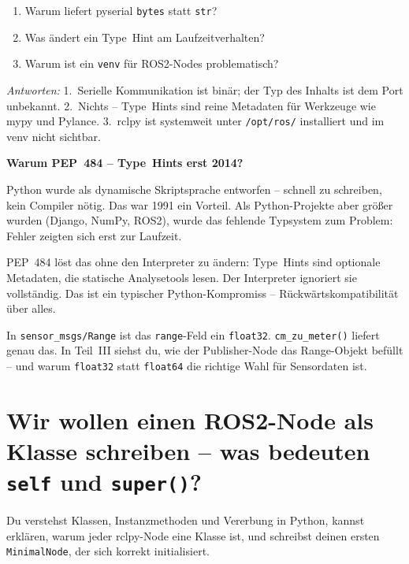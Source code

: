 \begin{quizBox}
\begin{enumerate}
\item Warum liefert pyserial \texttt{bytes} statt \texttt{str}?
\item Was ändert ein Type~Hint am Laufzeitverhalten?
\item Warum ist ein \texttt{venv} für ROS2-Nodes problematisch?
\end{enumerate}
\textit{Antworten:}
1.~Serielle Kommunikation ist binär; der Typ des Inhalts ist dem Port unbekannt.
2.~Nichts -- Type~Hints sind reine Metadaten für Werkzeuge wie mypy und Pylance.
3.~rclpy ist systemweit unter \texttt{/opt/ros/} installiert und im venv nicht sichtbar.
\end{quizBox}

\begin{haubeBox}
\textbf{Warum PEP~484 -- Type~Hints erst 2014?}

Python wurde als dynamische Skriptsprache entworfen -- schnell zu schreiben,
kein Compiler nötig. Das war 1991 ein Vorteil.
Als Python-Projekte aber größer wurden (Django, NumPy, ROS2),
wurde das fehlende Typsystem zum Problem:
Fehler zeigten sich erst zur Laufzeit.

PEP~484 löst das ohne den Interpreter zu ändern:
Type~Hints sind optionale Metadaten, die statische Analysetools lesen.
Der Interpreter ignoriert sie vollständig.
Das ist ein typischer Python-Kompromiss -- Rückwärtskompatibilität
über alles.
\end{haubeBox}

\begin{robotikBox}
In \texttt{sensor\_msgs/Range} ist das \texttt{range}-Feld ein \texttt{float32}.
\texttt{cm\_zu\_meter()} liefert genau das.
In Teil~III siehst du, wie der Publisher-Node das Range-Objekt befüllt --
und warum \texttt{float32} statt \texttt{float64} die richtige Wahl für Sensordaten ist.
\end{robotikBox}


\chapter{Wir wollen einen ROS2-Node als Klasse schreiben –
  was bedeuten \texttt{self} und \texttt{super()}?}

\begin{lernziele}
Du verstehst Klassen, Instanzmethoden und Vererbung in Python,
kannst erklären, warum jeder rclpy-Node eine Klasse ist,
und schreibst deinen ersten \texttt{MinimalNode},
der sich korrekt initialisiert.
\end{lernziele}


